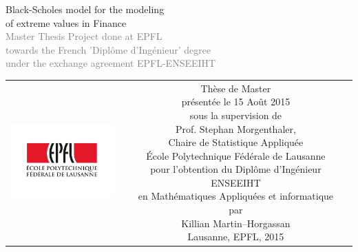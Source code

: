 \begin{titlepage}
\begin{center}
\sffamily


\null\vspace{2cm}
{\huge Black-Scholes model for the modeling \\[12pt] of extreme values in Finance} \\[24pt] 
\textcolor{gray}{\small{Master Thesis Project done at EPFL \\ towards the French 'Dipl\^{o}me d'Ingénieur' degree \\ under the exchange agreement EPFL-ENSEEIHT}}
    
\vfill

\begin{tabular} {cc}
\parbox{0.3\textwidth}{\includegraphics[width=4cm]{images/epfl}}
&
\parbox{0.7\textwidth}{%
	Thèse de Master\\
	présentée le 15 Ao\^{u}t 2015\\
	sous la supervision de\\[4pt]
	Prof. Stephan Morgenthaler, \\
	Chaire de Statistique Appliquée\\[4pt]
%
	École Polytechnique Fédérale de Lausanne\\[6pt]
	pour l'obtention du Dipl\^{o}me d'Ingénieur ENSEEIHT\\
	en Mathématiques Appliquées et informatique \\
	par\\ [4pt]
	\null \hspace{3em} Killian Martin--Horgassan\\[9pt]
%
\small
%
%
Lausanne, EPFL, 2015}
\end{tabular}
\end{center}
\vspace{2cm}
\end{titlepage}



